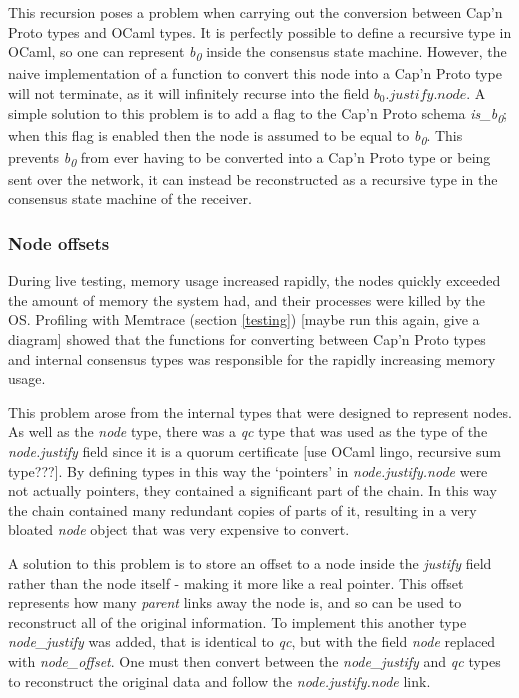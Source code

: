 This recursion poses a problem when carrying out the conversion between Cap'n Proto types and OCaml types. It is perfectly possible to define a recursive type in OCaml, so one can represent \textit{b\textsubscript{0}} inside the consensus state machine. However, the naive implementation of a function to convert this node into a Cap'n Proto type will not terminate, as it will infinitely recurse into the field $ b_0.\textit{justify}.\textit{node} $. A simple solution to this problem is to add a flag to the Cap'n Proto schema \textit{is\_b\textsubscript{0}}; when this flag is enabled then the node is assumed to be equal to \textit{b\textsubscript{0}}. This prevents \textit{b\textsubscript{0}} from ever having to be converted into a Cap'n Proto type or being sent over the network, it can instead be reconstructed as a recursive type in the consensus state machine of the receiver.

\subsubsection{Node offsets}
During live testing, memory usage increased rapidly, the nodes quickly exceeded the amount of memory the system had, and their processes were killed by the OS. Profiling with Memtrace (section \ref{testing}) [maybe run this again, give a diagram] showed that the functions for converting between Cap'n Proto types and internal consensus types was responsible for the rapidly increasing memory usage.

This problem arose from the internal types that were designed to represent nodes. As well as the \textit{node} type, there was a \textit{qc} type that was used as the type of the \textit{node.justify} field since it is a quorum certificate [use OCaml lingo, recursive sum type???]. By defining types in this way the `pointers' in \textit{node.justify.node} were not actually pointers, they contained a significant part of the chain. In this way the chain contained many redundant copies of parts of it, resulting in a very bloated \textit{node} object that was very expensive to convert.

A solution to this problem is to store an offset to a node inside the \textit{justify} field rather than the node itself - making it more like a real pointer. This offset represents how many \textit{parent} links away the node is, and so can be used to reconstruct all of the original information. To implement this another type \textit{node\_justify} was added, that is identical to \textit{qc}, but with the field \textit{node} replaced with \textit{node\_offset}. One must then convert between the \textit{node\_justify} and \textit{qc} types to reconstruct the original data and follow the \textit{node.justify.node} link.

